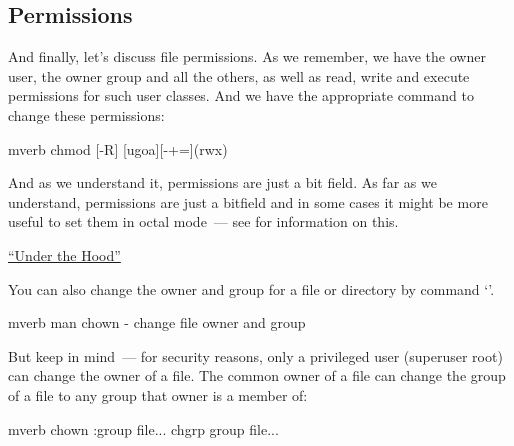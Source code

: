 \subsection*{Permissions}

And finally, let's discuss file permissions. As we remember, we have
the owner user, the owner group and all the others, as well as read, write
and execute permissions for such user classes. And we have the appropriate
command to change these permissions:
\begin{code}{mverb}
chmod [-R] [ugoa][-+=](rwx)
\end{code}
And as we understand it, permissions are just a bit field. As far as
we understand, permissions are just a bitfield and in some cases it might be
more useful to set them in octal mode~--- see for information on this.

\href{under_the_hood/octal_mode.md}{``Under the Hood''}%

You can also change the owner and group for a file or directory
by command `'.
\begin{code}{mverb}
man chown - change file owner and group
\end{code}
But keep in mind~--- for security reasons, only a privileged user
(superuser root) can change the owner of a file. The common owner of a file
can change the group of a file to any group that owner is a member of:
\begin{code}{mverb}
chown :group file...
chgrp group file...
\end{code}
